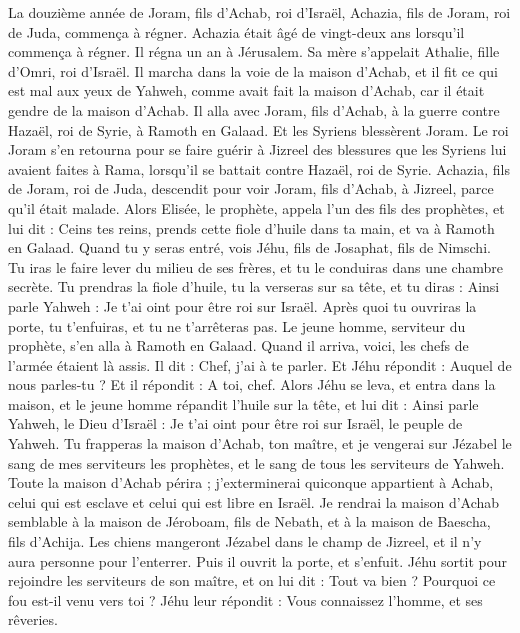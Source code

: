 \begin{multicols}{2}
La douzième année de Joram, fils d’Achab, roi d’Israël, Achazia, fils de Joram, roi de Juda, commença à régner.
Achazia était âgé de vingt-deux ans lorsqu’il commença à régner. Il régna un an à Jérusalem. Sa mère s’appelait Athalie, fille d’Omri, roi d’Israël.
Il marcha dans la voie de la maison d’Achab, et il fit ce qui est mal aux yeux de Yahweh, comme avait fait la maison d’Achab, car il était gendre de la maison d’Achab.
Il alla avec Joram, fils d’Achab, à la guerre contre Hazaël, roi de Syrie, à Ramoth en Galaad. Et les Syriens blessèrent Joram.
Le roi Joram s’en retourna pour se faire guérir à Jizreel des blessures que les Syriens lui avaient faites à Rama, lorsqu’il se battait contre Hazaël, roi de Syrie. Achazia, fils de Joram, roi de Juda, descendit pour voir Joram, fils d’Achab, à Jizreel, parce qu’il était malade.
\VerseOne{}Alors Elisée, le prophète, appela l’un des fils des prophètes, et lui dit : Ceins tes reins, prends cette fiole d’huile dans ta main, et va à Ramoth en Galaad.
Quand tu y seras entré, vois Jéhu, fils de Josaphat, fils de Nimschi. Tu iras le faire lever du milieu de ses frères, et tu le conduiras dans une chambre secrète.
Tu prendras la fiole d’huile, tu la verseras sur sa tête, et tu diras : Ainsi parle Yahweh : Je t’ai oint pour être roi sur Israël. Après quoi tu ouvriras la porte, tu t’enfuiras, et tu ne t’arrêteras pas.
Le jeune homme, serviteur du prophète, s’en alla à Ramoth en Galaad.
Quand il arriva, voici, les chefs de l’armée étaient là assis. Il dit : Chef, j’ai à te parler. Et Jéhu répondit : Auquel de nous parles-tu ? Et il répondit : A toi, chef.
Alors Jéhu se leva, et entra dans la maison, et le jeune homme répandit l’huile sur la tête, et lui dit : Ainsi parle Yahweh, le Dieu d’Israël : Je t’ai oint pour être roi sur Israël, le peuple de Yahweh.
Tu frapperas la maison d’Achab, ton maître, et je vengerai sur Jézabel le sang de mes serviteurs les prophètes, et le sang de tous les serviteurs de Yahweh.
Toute la maison d’Achab périra ; j’exterminerai quiconque appartient à Achab, celui qui est esclave et celui qui est libre en Israël.
Je rendrai la maison d’Achab semblable à la maison de Jéroboam, fils de Nebath, et à la maison de Baescha, fils d’Achija.
Les chiens mangeront Jézabel dans le champ de Jizreel, et il n’y aura personne pour l’enterrer. Puis il ouvrit la porte, et s’enfuit.
Jéhu sortit pour rejoindre les serviteurs de son maître, et on lui dit : Tout va bien ? Pourquoi ce fou est-il venu vers toi ? Jéhu leur répondit : Vous connaissez l’homme, et ses rêveries.

\end{multicols}
